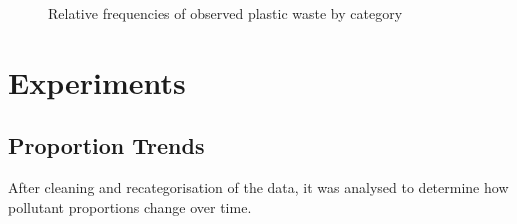 \documentclass[10pt]{article}\usepackage[]{graphicx}\usepackage[]{color}
\newenvironment{knitrout}{}{} %
\begin{document}
\begin{figure}[H]
\begin{center}
\begin{knitrout}
\end{knitrout}
\caption {Relative frequencies of observed plastic waste by category}
\label{figB}
\end {center}
\end {figure}


















\pagebreak
\section{Experiments}



\subsection{Proportion Trends}
After cleaning and recategorisation of the data, it was analysed to determine how pollutant proportions change over time.\\
\end{document}
